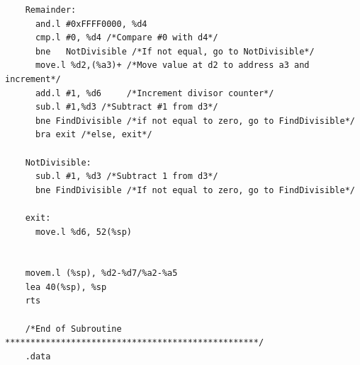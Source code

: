 \documentclass[10pt, letterpaper, titlepage]{article} %
\begin{document}
\begin{lstlisting}
	Remainder:
	  and.l #0xFFFF0000, %d4
	  cmp.l	#0, %d4 /*Compare #0 with d4*/
	  bne	NotDivisible /*If not equal, go to NotDivisible*/
	  move.l %d2,(%a3)+ /*Move value at d2 to address a3 and increment*/
	  add.l #1, %d6		/*Increment divisor counter*/
	  sub.l #1,%d3 /*Subtract #1 from d3*/
	  bne FindDivisible /*if not equal to zero, go to FindDivisible*/
	  bra exit /*else, exit*/
	
	NotDivisible:
	  sub.l #1, %d3 /*Subtract 1 from d3*/
	  bne FindDivisible /*If not equal to zero, go to FindDivisible*/
	
	exit:
	  move.l %d6, 52(%sp)
	
	
	movem.l (%sp), %d2-%d7/%a2-%a5
	lea 40(%sp), %sp
	rts
	
	/*End of Subroutine **************************************************/
	.data
\end{lstlisting}

\newpage
\end{document}
